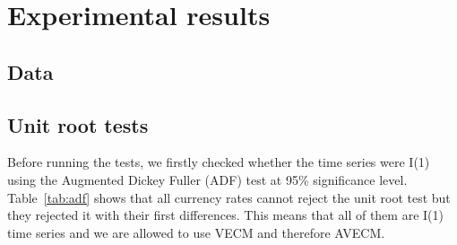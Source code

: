 \documentclass[twocolumn]{svjour3}          %
\begin{document}
\section{Experimental results}
\label{sec:results}
\subsection{Data} \label{sec:unitroot}
%

\subsection{Unit root tests} \label{sec:unitroot}
Before running the tests, we firstly checked whether the time series were
I(1) using the Augmented Dickey Fuller (ADF) test at 95\% significance level.
Table~\ref{tab:adf} shows that all currency rates cannot reject the unit root
test but they rejected it with their first differences. This means that all of
them are I(1) time series and we are allowed to use VECM and therefore AVECM.
\end{document}
